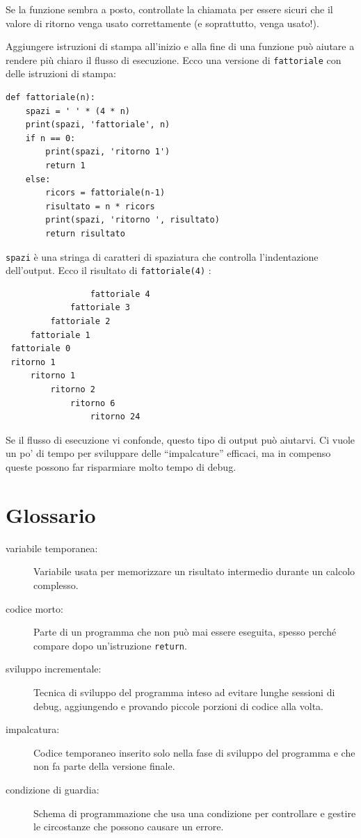 \documentclass[10pt]{book}
\begin{document}
Se la funzione sembra a posto, controllate la chiamata per essere sicuri che il valore di ritorno venga usato correttamente (e soprattutto, venga usato!).

Aggiungere istruzioni di stampa all'inizio e alla fine di una funzione può aiutare a rendere più chiaro il flusso di esecuzione. Ecco una versione di {\tt fattoriale} con delle istruzioni di stampa:

\begin{verbatim}
def fattoriale(n):
    spazi = ' ' * (4 * n)
    print(spazi, 'fattoriale', n)
    if n == 0:
        print(spazi, 'ritorno 1')
        return 1
    else:
        ricors = fattoriale(n-1)
        risultato = n * ricors
        print(spazi, 'ritorno ', risultato)
        return risultato
\end{verbatim}
%
{\tt spazi} è una stringa di caratteri di spaziatura che controlla l'indentazione dell'output. Ecco il risultato di {\tt fattoriale(4)} :

\begin{verbatim}
                 fattoriale 4
             fattoriale 3
         fattoriale 2
     fattoriale 1
 fattoriale 0
 ritorno 1
     ritorno 1
         ritorno 2
             ritorno 6
                 ritorno 24
\end{verbatim}
%
Se il flusso di esecuzione vi confonde, questo tipo di output può aiutarvi. Ci vuole un po' di tempo per sviluppare delle ``impalcature'' efficaci, ma in compenso queste possono far risparmiare molto tempo di debug.


\section{Glossario}

\begin{description}

\item[variabile temporanea:]  Variabile usata per memorizzare un risultato intermedio durante un calcolo complesso.

\item[codice morto:]  Parte di un programma che non può mai essere eseguita, spesso perché compare dopo un'istruzione {\tt return}.

\item[sviluppo incrementale:]  Tecnica di sviluppo del programma inteso ad evitare lunghe sessioni di debug, aggiungendo e provando piccole porzioni di codice alla volta.

\item[impalcatura:]  Codice temporaneo inserito solo nella fase di sviluppo del programma e che non fa parte della versione finale.

\item[condizione di guardia:]  Schema di programmazione che usa una condizione per controllare e gestire le circostanze che possono causare un errore.

\end{description}
\end{document}

